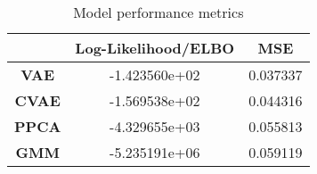 \begin{table}
\centering
\caption{Model performance metrics}
\label{table:metrics}
\begin{tabular}{ccc}
\toprule
{} &  \textbf{Log-Likelihood/ELBO} &  \textbf{MSE} \\
\midrule
\textbf{VAE } &                 -1.423560e+02 &      0.037337 \\
\textbf{CVAE} &                 -1.569538e+02 &      0.044316 \\
\textbf{PPCA} &                 -4.329655e+03 &      0.055813 \\
\textbf{GMM } &                 -5.235191e+06 &      0.059119 \\
\bottomrule
\end{tabular}
\end{table}
